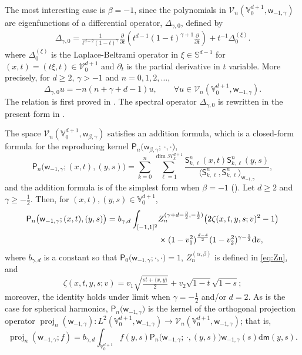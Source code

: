 \documentclass{amsart}
\theoremstyle{remark}
\def\la{{\langle}}
\def\ra{{\rangle}}
\def\d{\mathrm{d}}
\def\sph{{\mathbb{S}^{d-1}}}
\def\a{{\alpha}}
\def\b{{\beta}}
\def\g{{\gamma}}
\def\la{{\langle}}
\def\ra{{\rangle}}
\def\CH{{\mathcal H}}
\def\CV{{\mathcal V}}
\def\VV{{\mathbb V}}
\def\proj{\operatorname{proj}}
\def\la{{\langle}}
\def\ra{{\rangle}}
\def\d{\mathrm{d}}
\def\sph{{\mathbb{S}^{d-1}}}
\def\sP{{\mathsf P}}
\def\sS{{\mathsf S}}
\def\sm{{\mathsf m}}
\def\sw{{\mathsf w}}
\def\a{{\alpha}}
\def\b{{\beta}}
\def\g{{\gamma}}
\def\la{{\langle}}
\def\ra{{\rangle}}
\def\CH{{\mathcal H}}
\def\CV{{\mathcal V}}
\def\VV{{\mathbb V}}
\def\proj{\operatorname{proj}}
\def\f{\frac}
\def\f{\frac}
\begin{document}
The most interesting case is $\b = -1$, since the polynomials in $\CV_n(\VV_0^{d+1},\sw_{-1,\g})$ are eigenfunctions 
of a differential operator, $\Delta_{\g,0}$, defined by 
\begin{align}\label{differential operator}
\Delta_{\g,0} = \frac{1}{t^{d-2}(1-t)^\g} \frac{\partial}{\partial t} \left ( t^{d-1} (1-t)^{\g+1}  \frac{\partial}{\partial t}  \right)
    + t^{-1} \Delta_0^{(\xi)}. 
\end{align}
where $\Delta_0^{(\xi)}$ is the Laplace-Beltrami operator in $\xi \in \sph$ for $(x,t) = (t\xi,t)\in \CV_0^{d+1}$ and 
$\partial_t$ is the partial derivative in $t$ variable. More precisely, for $d \ge 2$, $\g> -1$ and $n =0,1,2,\ldots$,
\begin{equation}\label{eq:eigen-eqn}
    \Delta_{\g,0} u =  -n (n+\g+d-1) u, \qquad \forall u \in \CV_n(\VV_0^{d+1}, \sw_{-1,\g}).
\end{equation}
The relation is first proved in \cite[Theorem 7.2]{X20}. The spectral operator $\Delta_{\g,0}$ is rewritten in the present 
form in \cite{X23}.

The space $\CV_n(\VV_0^{d+1}, \sw_{\b,\g})$ satisfies an addition formula, which is a closed-form formula for
the reproducing kernel $\sP_n\big(\sw_{\b,\g}; \,\cdot, \cdot \big)$, 
$$
\sP_n\big(\sw_{-1,\g}; (x,t), (y,s)\big) = \sum_{k=0}^n \sum_{\ell=1}^{\dim \CH_k^{d+1}} \frac{ \sS_{k, \ell}^n (x,t)  \sS_{k, \ell}^n (y,s)}
   {\la \sS_{k, \ell}^n,\sS_{k, \ell}^n \ra_{\sw_{-1,\g}} },
$$
and the addition formula is of the simplest form when $\b = -1$ (\cite[Theorem 8.2]{X20}). Let $d \ge 2$ and $\g \ge -\f12$. 
Then, for $(x,t), (y,s) \in \VV_0^{d+1}$, 
\begin{align} \label{eq:sfPbCone}
 \sP_n \big(\sw_{-1,\g}; (x,t), (y,s)\big) =  b_{\g,d}  \int_{[-1,1]^2} & Z_{n}^{(\g+d-\f32,-\f12)} \big( 2 \zeta (x,t,y,s; v)^2-1\big) \\
  & \times  (1-v_1^2)^{\f{d-4}{2}} (1-v_2^2)^{\g-\f12} \d v, \notag
\end{align} 
where $b_{\g,d}$ is a constant so that $\sP_0\big(\sw_{-1,\g}; \cdot,\cdot\big) =1$, $Z_n^{(\a,\b)}$ is defined in
\eqref{eq:Zn}, and 
\begin{equation}\label{eq:zetaV0}
 \zeta (x,t,y,s; v)  = v_1 \sqrt{\tfrac{st + \la x,y \ra}2}+ v_2 \sqrt{1-t}\sqrt{1-s};
\end{equation}
moreover, the identity holds under limit when $\g = -\f12$ and/or $d = 2$. As is the case for spherical harmonics,
$\sP_n\big(\sw_{-1,\g})$ is the kernel of the orthogonal projection operator $\proj_n(\sw_{-1,\g}): L^2(\VV_0^{d+1},\sw_{-1,\g}) 
\to \CV_n(\VV_0^{d+1}, \sw_{-1,\g})$; that is, 
$$
\proj_n(\sw_{-1,\g};f) =  b_{\g,d} \int_{\VV_0^{d+1}} f(y,s) \sP_n\big(\sw_{-1,\g}; \,\cdot, (y,s) \big)  \sw_{-1,\g}(s) \d\sm(y,s).
$$
\end{document}
